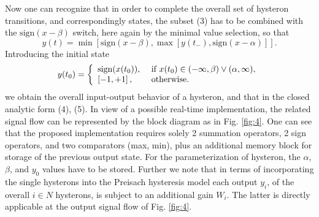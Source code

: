\documentclass[journal]{IEEEtran}
\begin{document}
Now one can recognize that in order to complete the overall set of
hysteron transitions, and correspondingly states,  the subset (3)
has to be combined with the $\mathrm{sign}(x-\beta)$ switch, here
again by the minimal value selection, so that
\begin{equation}\label{4}
y(t)=\min\left[\mathrm{sign}(x-\beta), \max \left[ y(t_{-}),
\mathrm{sign} (x-\alpha) \right] \right].
\end{equation}
Introducing the initial state
\begin{equation}\label{5}
y(t_{0})= \left\{\begin{array}{ll}
    \mathrm{sign}(x(t_{0})), & \hbox{ if } x(t_{0}) \in (-\infty, \beta) \vee (\alpha, \infty), \\
    \left[-1,+1\right], & \hbox{ otherwise.}
\end{array}\right.
\end{equation}
we obtain the overall input-output behavior of a hysteron, and
that in the closed analytic form (4), (5). In view of a possible
real-time implementation, the related signal flow can be
represented by the block diagram as in Fig. \ref{fig:4}. One can
see that the proposed implementation requires solely 2 summation
operators, 2 sign operators, and two comparators (max, min), plus
an additional memory block for storage of the previous output
state. For the parameterization of hysteron, the $\alpha$,
$\beta$, and $y_{0}$ values have to be stored. Further we note
that in terms of incorporating the single hysterons into the
Preisach hysteresis model each output $y_{i}$, of the overall $i
\in N$ hysterons, is subject to an additional gain $W_{i}$. The
latter is directly applicable at the output signal flow of Fig.
\ref{fig:4}.
\end{document}
